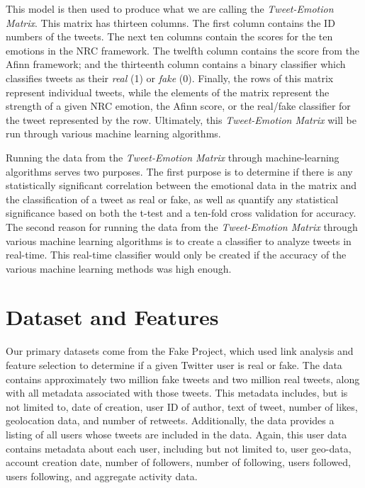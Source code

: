 \documentclass{article}[12pt]
\numberwithin{equation}{subsection}
\begin{document}
\begin{flushleft}
This model is then used to produce what we are calling the \emph{Tweet-Emotion Matrix}.  This matrix has thirteen columns.  The first column contains the ID numbers of the tweets.  The next ten columns contain the scores for the ten emotions in the NRC framework.  The twelfth column contains the score from the Afinn framework; and the thirteenth column contains a binary classifier which classifies tweets as their \emph{real} (1) or \emph{fake} (0). Finally, the rows of this matrix represent individual tweets, while the elements of the matrix represent the strength of a given NRC emotion, the Afinn score, or the real/fake classifier for the tweet represented by the row.  Ultimately, this \emph{Tweet-Emotion Matrix} will be run through various machine learning algorithms. \newline

Running the data from the \emph{Tweet-Emotion Matrix} through machine-learning algorithms serves two purposes.  The first purpose is to determine if there is any statistically significant correlation between the emotional data in the matrix and the classification of a tweet as real or fake, as well as quantify any statistical significance based on both the t-test and a ten-fold cross validation for accuracy.  The second reason for running the data from the \emph{Tweet-Emotion Matrix} through various machine learning algorithms is to create a classifier to analyze tweets in real-time.  This real-time classifier would only be created if the accuracy of the various machine learning methods was high enough.


\section{Dataset and Features}

Our primary datasets come from the Fake Project, which used link analysis and feature selection to determine if a given Twitter user is real or fake.  The data contains approximately two million fake tweets and two million real tweets, along with all metadata associated with those tweets.  This metadata includes, but is not limited to, date of creation, user ID of author, text of tweet, number of likes, geolocation data, and number of retweets.  Additionally, the data provides a listing of all users whose tweets are included in the data.  Again, this user data contains metadata about each user, including but not limited to, user geo-data, account creation date, number of followers, number of following, users followed, users following, and aggregate activity data. \newline


\end{flushleft}
\end{document}
